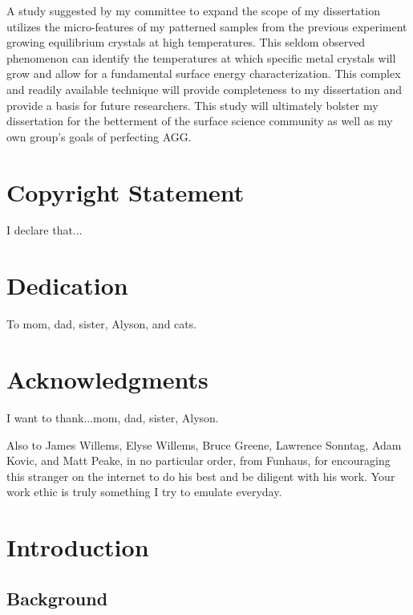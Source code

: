 \documentclass[12pt,letterpaper]{report}
\begin{document}
A study suggested by my committee to expand the scope of my dissertation utilizes the micro-features of my patterned samples from the previous experiment growing equilibrium crystals at high temperatures. This seldom observed phenomenon can identify the temperatures at which specific metal crystals will grow and allow for a fundamental surface energy characterization. This complex and readily available technique will provide completeness to my dissertation and provide a basis for future researchers. This study will ultimately bolster my dissertation for the betterment of the surface science community as well as my own group’s goals of perfecting AGG. 



\begin{titlepage}
	\clearpage 
	\maketitle
	
	\thispagestyle{empty}
\end{titlepage}

\chapter*{Copyright Statement}
I declare that...

\chapter*{Dedication}
To mom, dad, sister, Alyson, and cats.



\chapter*{Acknowledgments}
I want to thank...mom, dad, sister, Alyson. 

Also to James Willems, Elyse Willems, Bruce Greene, Lawrence Sonntag, Adam Kovic, and Matt Peake, in no particular order, from Funhaus, for encouraging this stranger on the internet to do his best and be diligent with his work. Your work ethic is truly something I try to emulate everyday. 

\tableofcontents
\listoffigures
\listoftables

\chapter{Introduction}\label{chapter1}
\section{Background}\label{section1}
\end{document}
